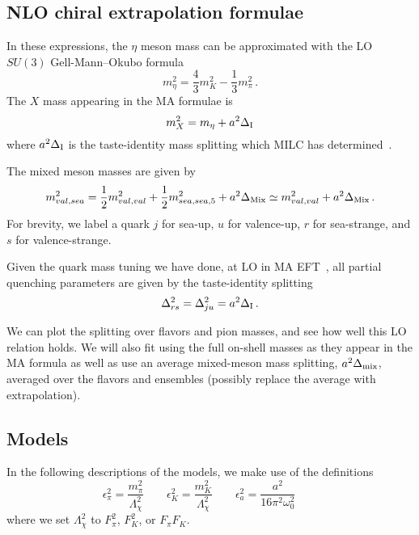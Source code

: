 \documentclass[prd,tightenlines,preprintnumbers,showpacs,superscriptaddress,notitlepage,eqsecnum,floatfix,notitlepage]{revtex4-1}
\begin{document}
\subsection{NLO chiral extrapolation formulae}

In these expressions, the $\eta$ meson mass can be approximated with the LO $SU(3)$ Gell-Mann--Okubo formula
\begin{equation} \label{eqn:GMO_relation}
m_\eta^2 = \frac{4}{3} m_K^2 - \frac{1}{3}m_\pi^2\, .
\end{equation}
The $X$ mass appearing in the MA formulae is
\begin{equation}
m_X^2 = m_\eta + a^2 \Delta_{\rm I}
\end{equation}
where $a^2 \Delta_{\rm I}$ is the taste-identity mass splitting which MILC has determined~\cite{Bazavov:2012xda}.

The mixed meson masses are given by
\begin{equation}
m_{val,sea}^2 = \frac{1}{2}m_{val,val}^2 + \frac{1}{2}m_{sea,sea,5}^2 + a^2 \Delta_{\rm Mix}
\simeq m_{val,val}^2 + a^2 \Delta_{\rm Mix}\, .
\end{equation}
For brevity, we label a quark $j$ for sea-up, $u$ for valence-up, $r$ for sea-strange, and $s$ for valence-strange.

Given the quark mass tuning we have done, at LO in MA EFT~\cite{Chen:2006wf}, all partial quenching parameters are given by the taste-identity splitting
\begin{equation}
\Delta_{rs}^2 = \Delta_{ju}^2 = a^2 \Delta_{\rm I}\, .
\end{equation}

We can plot the splitting over flavors and pion masses, and see how well this LO relation holds.  We will also fit using the full on-shell masses as they appear in the MA formula as well as use an average mixed-meson mass splitting, $a^2 \Delta_{\rm mix}$, averaged over the flavors and ensembles (possibly replace the average with extrapolation).





\subsection{Models} \label{section:base_models}
In the following descriptions of the models, we make use of the definitions
\begin{equation}
\epsilon_\pi^2 = \frac{m_\pi^2}{\Lambda_\chi^2} \qquad
\epsilon_K^2 = \frac{m_K^2}{\Lambda_\chi^2} \qquad
\epsilon_a^2 = \frac{a^2}{16 \pi ^2\omega_0^2} \qquad
\end{equation}
where we set $\Lambda_\chi^2$ to $F_\pi^2$, $F_K^2$, or $F_\pi F_K$.
\end{document}

